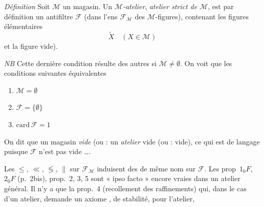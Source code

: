 \documentclass[11pt,a4paper]{article}
\begin{document}

\emph{Définition} Soit $\mathcal{M}$ un magasin. Un \emph{$\mathcal{M}$-atelier},  \emph{atelier strict de $\mathcal{M}$}, est par définition un antifiltre $\mathcal{F}$ (dans l'ens $\mathcal{F}_{\mathcal{M}}$ des $\mathcal{M}$-figures),   contenant les  figures élémentaires 
\[
  \widetilde{X} \quad (X \in \mathcal{M})
\]
et la figure vide). 

\emph{NB} Cette dernière condition résulte des autres si $\mathcal{M} \neq \emptyset$. On voit que les conditions suivantes  équivalentes
\begin{enumerate}
  \item[(i)] $\mathcal{M} = \emptyset$
  \item[(ii)] $\mathcal{F} = \{\emptyset\}$
  \item[(iii)] $\mathrm{card}\, \mathcal{F} = 1$
\end{enumerate}
On dit   que   un magasin \struck{\ill{}} \emph{vide} (ou :  un \emph{atelier}  vide (ou :  vide), ce qui est  de langage puisque $\mathcal{F}$ \ill{} n'est pas vide ….


Les   $\leq$, $\ll$, $\lessgtr$, $\parallel$ sur $\mathcal{F}_{\mathcal{M}}$ induisent des   de même nom sur $\mathcal{F}$.
Les prop~$1_0F$, $2_0F$ (p.~2bis), prop.~2, 3, 5 sont « ipso facto » encore vraies dans un atelier général. Il n'y a que la prop.~4 (recollement des raffinements) qui, dans le cas d'un atelier, demande un axiome  \emph{\ill{}}, de stabilité,  pour l'atelier,
\end{document}
